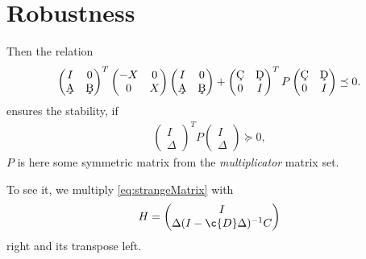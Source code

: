 \chapter{Robustness}

Then the relation 
\begin{align}
\label{eq:strangeMatrix}
\begin{pmatrix}
I & 0 \\ \c{A} &  \c{B}
\end{pmatrix}^T\begin{pmatrix}
-X & 0 \\ 0 & X
\end{pmatrix} 
\begin{pmatrix}
I & 0 \\ \c{A} &  \c{B}
\end{pmatrix} + 
\begin{pmatrix}
\c{C} & \c{D} \\ 0 & I
\end{pmatrix}^T
P
\begin{pmatrix}
\c{C} & \c{D} \\ 0 & I
\end{pmatrix} \preceq 0.
\end{align}
ensures the stability, if 
\begin{align}
\label{eq:PDelta}
\begin{pmatrix}
I \\ \Delta
\end{pmatrix}^T 
P
\begin{pmatrix}
I \\ \Delta
\end{pmatrix} \succeq 0, 
\end{align}
$P$ is here some symmetric matrix from the \textit{multiplicator} matrix set. 

To see it, we multiply  \eqref{eq:strangeMatrix} with 
\begin{align}
\label{eq:H}
H = \begin{pmatrix}
I \\ \Delta ( I - \c{D} \Delta)^{-1}C
\end{pmatrix}
\end{align}
right and its transpose left. 







